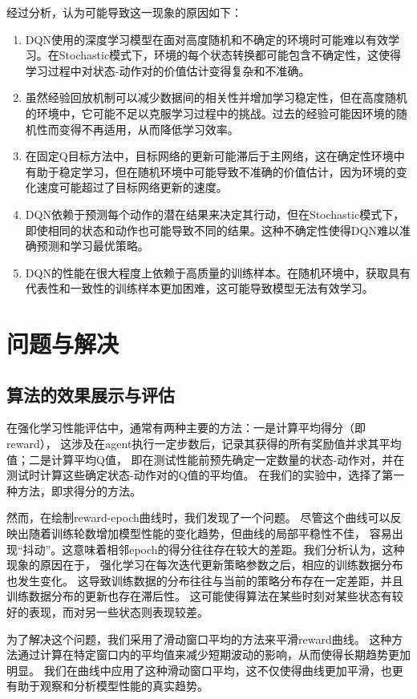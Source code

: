 \documentclass{thuemp}
\begin{document}
经过分析，认为可能导致这一现象的原因如下：
\begin{enumerate}
  \item DQN使用的深度学习模型在面对高度随机和不确定的环境时可能难以有效学习。在Stochastic模式下，环境的每个状态转换都可能包含不确定性，这使得学习过程中对状态-动作对的价值估计变得复杂和不准确。
  \item 虽然经验回放机制可以减少数据间的相关性并增加学习稳定性，但在高度随机的环境中，它可能不足以克服学习过程中的挑战。过去的经验可能因环境的随机性而变得不再适用，从而降低学习效率。
  \item 在固定Q目标方法中，目标网络的更新可能滞后于主网络，这在确定性环境中有助于稳定学习，但在随机环境中可能导致不准确的价值估计，因为环境的变化速度可能超过了目标网络更新的速度。
  \item DQN依赖于预测每个动作的潜在结果来决定其行动，但在Stochastic模式下，即使相同的状态和动作也可能导致不同的结果。这种不确定性使得DQN难以准确预测和学习最优策略。
  \item DQN的性能在很大程度上依赖于高质量的训练样本。在随机环境中，获取具有代表性和一致性的训练样本更加困难，这可能导致模型无法有效学习。
\end{enumerate}

\section{问题与解决}
\subsection{算法的效果展示与评估}
在强化学习性能评估中，通常有两种主要的方法：一是计算平均得分（即reward），
这涉及在agent执行一定步数后，记录其获得的所有奖励值并求其平均值；二是计算平均Q值，
即在测试性能前预先确定一定数量的状态-动作对，并在测试时计算这些确定状态-动作对的Q值的平均值。
在我们的实验中，选择了第一种方法，即求得分的方法。

然而，在绘制reward-epoch曲线时，我们发现了一个问题。
尽管这个曲线可以反映出随着训练轮数增加模型性能的变化趋势，但曲线的局部平稳性不佳，
容易出现“抖动”。这意味着相邻epoch的得分往往存在较大的差距。我们分析认为，这种现象的原因在于，
强化学习在每次迭代更新策略参数之后，相应的训练数据分布也发生变化。
这导致训练数据的分布往往与当前的策略分布存在一定差距，并且训练数据分布的更新也存在滞后性。
这可能使得算法在某些时刻对某些状态有较好的表现，而对另一些状态则表现较差。

为了解决这个问题，我们采用了滑动窗口平均的方法来平滑reward曲线。
这种方法通过计算在特定窗口内的平均值来减少短期波动的影响，从而使得长期趋势更加明显。
我们在曲线中应用了这种滑动窗口平均，这不仅使得曲线更加平滑，也更有助于观察和分析模型性能的真实趋势。
\end{document}
